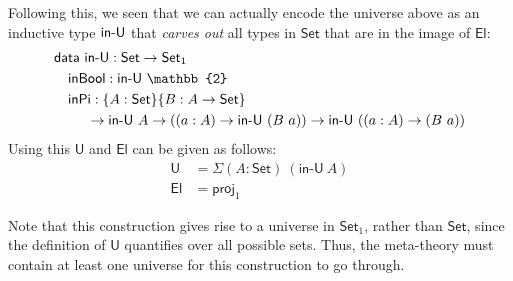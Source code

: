 \documentclass{easychair}
\newcommand{\ad}[1]{\AgdaFunction{#1}}
\newcommand{\Set}{\textsf{Set}}
\newcommand{\U}{\textsf{U}}
\newcommand{\El}{\textsf{El}}
\providecommand\mathbbm{\mathbb}
\begin{document}
Following this, we seen that we can actually encode the universe above as an
inductive type $\ad{in-U}$ that \emph{carves out} all types in $\Set$ that are
in the image of $\El$:
%
\begin{align*}
  & \textsf{data}\ \ad{in-U} : \Set \to \Set_1 \\
  & \quad \textsf{inBool} : \textsf{in-U}\ \mathbbm{2} \\
  & \quad \textsf{inPi}
  :  \{A : \Set\} \{B : A \to \Set\}\\
  & \ \qquad \to \ad{in-U}\ A
  \to ((a : A) \to \ad{in-U}\ (B\ a))
  \to \ad{in-U}\ ((a : A) \to (B\ a))
\end{align*}
Using this $\U$ and $\El$ can be given as follows:
\begin{align*}
  \U & = \Sigma (A : \Set)\ (\textsf{in-U}\ A) \\
  \El & = \textsf{proj}_1
\end{align*}

Note that this construction gives rise to a universe in $\Set_1$, rather than
$\Set$, since the definition of $\U$ quantifies over all possible sets. Thus,
the meta-theory must contain at least one universe for this construction to go
through.



\end{document}
